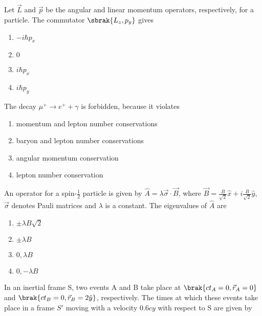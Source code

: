 
\iffalse
    \title{Assignment}
    \author{EE24BTECH11034}
    \section{ph}
    \chapter{2015}
  \fi
\item Let $\vec{L}$ and $\vec{p}$ be the angular and linear momentum operators, respectively, for a particle. The commutator $\sbrak{L_z, p_y}$ gives

\begin{enumerate}
    \item $-i\hbar p_x$
    \item $0$
    \item $i\hbar p_x$
    \item $i\hbar p_y$
\end{enumerate}

\item The decay $\mu^+ \rightarrow e^+ + \gamma$ is forbidden, because it violates

\begin{enumerate}
    \item momentum and lepton number conservations
    \item baryon and lepton number conservations
    \item angular momentum conservation
    \item lepton number conservation
\end{enumerate}

\item An operator for a spin-$\frac{1}{2}$ particle is given by $\hat{A}=\lambda \vec{\sigma} \cdot \vec{B}$, where $\vec{B}=\frac{B}{\sqrt{2}}\hat{x}+i\frac{B}{\sqrt{2}}\hat{y}$, $\vec{\sigma}$ denotes Pauli matrices and $\lambda$ is a constant. The eigenvalues of $\hat{A}$ are

\begin{enumerate}
    \item $\pm \lambda B \sqrt{2}$
    \item $\pm \lambda B$
    \item $0, \lambda B$
    \item $0, -\lambda B$
\end{enumerate}

\item In an inertial frame S, two events A and B take place at $\brak{ct_A = 0, \vec{r}_A = 0}$ and $\brak{ct_B = 0, \vec{r}_B = 2\hat{y}}$, respectively. The times at which these events take place in a frame $S'$ moving with a velocity $0.6cy$ with respect to S are given by

